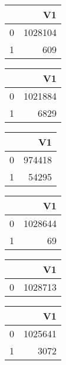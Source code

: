 \bigskip\bigskip
\centering
\begin{tabular}{rr}
  \hline
 & V1 \\ 
  \hline
0 & 1028104 \\ 
  1 & 609 \\ 
   \hline
\end{tabular}

\bigskip\bigskip
\centering
\begin{tabular}{rr}
  \hline
 & V1 \\ 
  \hline
0 & 1021884 \\ 
  1 & 6829 \\ 
   \hline
\end{tabular}

\bigskip\bigskip
\centering
\begin{tabular}{rr}
  \hline
 & V1 \\ 
  \hline
0 & 974418 \\ 
  1 & 54295 \\ 
   \hline
\end{tabular}

\bigskip\bigskip
\centering
\begin{tabular}{rr}
  \hline
 & V1 \\ 
  \hline
0 & 1028644 \\ 
  1 &  69 \\ 
   \hline
\end{tabular}

\bigskip\bigskip
\centering
\begin{tabular}{rr}
  \hline
 & V1 \\ 
  \hline
0 & 1028713 \\ 
   \hline
\end{tabular}

\bigskip\bigskip
\centering
\begin{tabular}{rr}
  \hline
 & V1 \\ 
  \hline
0 & 1025641 \\ 
  1 & 3072 \\ 
   \hline
\end{tabular}

